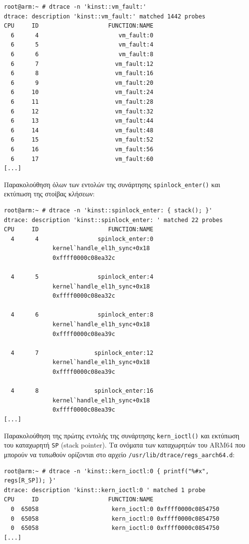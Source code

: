 \documentclass[12pt]{article}
\begin{document}
\begin{lstlisting}
root@arm:~ # dtrace -n 'kinst::vm_fault:'
dtrace: description 'kinst::vm_fault:' matched 1442 probes
CPU     ID                    FUNCTION:NAME
  6      4                       vm_fault:0
  6      5                       vm_fault:4
  6      6                       vm_fault:8
  6      7                      vm_fault:12
  6      8                      vm_fault:16
  6      9                      vm_fault:20
  6     10                      vm_fault:24
  6     11                      vm_fault:28
  6     12                      vm_fault:32
  6     13                      vm_fault:44
  6     14                      vm_fault:48
  6     15                      vm_fault:52
  6     16                      vm_fault:56
  6     17                      vm_fault:60
[...]
\end{lstlisting}

Παρακολούθηση όλων των εντολών της συνάρτησης \lstinline{spinlock_enter()} και
εκτύπωση της στοίβας κλήσεων:

\begin{lstlisting}
root@arm:~ # dtrace -n 'kinst::spinlock_enter: { stack(); }'
dtrace: description 'kinst::spinlock_enter: ' matched 22 probes
CPU     ID                    FUNCTION:NAME
  4      4                 spinlock_enter:0
              kernel`handle_el1h_sync+0x18
              0xffff0000c08ea32c

  4      5                 spinlock_enter:4
              kernel`handle_el1h_sync+0x18
              0xffff0000c08ea32c

  4      6                 spinlock_enter:8
              kernel`handle_el1h_sync+0x18
              0xffff0000c08ea39c

  4      7                spinlock_enter:12
              kernel`handle_el1h_sync+0x18
              0xffff0000c08ea39c

  4      8                spinlock_enter:16
              kernel`handle_el1h_sync+0x18
              0xffff0000c08ea39c
[...]
\end{lstlisting}

Παρακολούθηση της πρώτης εντολής της συνάρτησης \lstinline{kern_ioctl()} και
εκτύπωση του καταχωρητή \lstinline{SP} (stack pointer). Τα ονόματα των
καταχωρητών του ARM64 που μπορούν να τυπωθούν ορίζονται στο αρχείο
\lstinline{/usr/lib/dtrace/regs_aarch64.d}:

\begin{lstlisting}
root@arm:~ # dtrace -n 'kinst::kern_ioctl:0 { printf("%#x", regs[R_SP]); }'
dtrace: description 'kinst::kern_ioctl:0 ' matched 1 probe
CPU     ID                    FUNCTION:NAME
  0  65058                     kern_ioctl:0 0xffff0000c0854750
  0  65058                     kern_ioctl:0 0xffff0000c0854750
  0  65058                     kern_ioctl:0 0xffff0000c0854750
[...]
\end{lstlisting}
\end{document}
